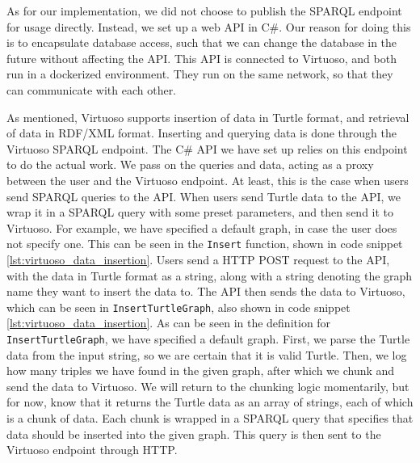 As for our implementation, we did not choose to publish the SPARQL endpoint for \knox{} usage directly. Instead, we set up a web API in C\#.
Our reason for doing this is to encapsulate database access, such that we can change the database in the future without affecting the API.
This API is connected to Virtuoso, and both run in a dockerized environment. They run on the same network, so that they can communicate with each other.

As mentioned, Virtuoso supports insertion of data in Turtle format, and retrieval of data in RDF/XML format. Inserting and querying data is done through the Virtuoso SPARQL endpoint. The C\# API we have set up relies on this endpoint to do the actual work. We pass on the queries and data, acting as a proxy between the user and the Virtuoso endpoint. At least, this is the case when users send SPARQL queries to the API. When users send Turtle data to the API, we wrap it in a SPARQL query with some preset parameters, and then send it to Virtuoso. For example, we have specified a default graph, in case the user does not specify one.
This can be seen in the \texttt{Insert} function, shown in code snippet \ref{lst:virtuoso_data_insertion}. Users send a HTTP POST request to the API, with the data in Turtle format as a string, along with a string denoting the graph name they want to insert the data to. The API then sends the data to Virtuoso, which can be seen in \texttt{InsertTurtleGraph}, also shown in code snippet \ref{lst:virtuoso_data_insertion}. As can be seen in the definition for \texttt{InsertTurtleGraph}, we have specified a default graph. First, we parse the Turtle data from the input string, so we are certain that it is valid Turtle. Then, we log how many triples we have found in the given graph, after which we chunk and send the data to Virtuoso. We will return to the chunking logic momentarily, but for now, know that it returns the Turtle data as an array of strings, each of which is a chunk of data. Each chunk is wrapped in a SPARQL query that specifies that data should be inserted into the given graph. This query is then sent to the Virtuoso endpoint through HTTP.

